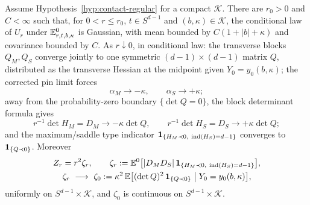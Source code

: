 \begin{proposition}\label{prop:contact-soft-limits}
Assume Hypothesis~\ref{hyp:contact-regular} for a compact $\mathcal K$. There are $r_0>0$ and $C<\infty$ such that, for $0<r\le r_0$, $t\in S^{d-1}$ and $(b,\kappa)\in\mathcal K$, the conditional law of $U_r$ under $\mathbb E^0_{r,t,b,\kappa}$ is Gaussian, with mean bounded by $C(1+|b|+\kappa)$ and covariance bounded by $C$. As $r\downarrow0$, in conditional law: the transverse blocks $Q_M,Q_S$ converge jointly to one symmetric $(d-1)\times(d-1)$ matrix $Q$, distributed as the transverse Hessian at the midpoint given $Y_0=y_0(b,\kappa)$; the corrected pin limit forces
\begin{equation}\label{eq:contact-alpha-limits}
\alpha_M\to-\kappa,\qquad\alpha_S\to+\kappa ;
\end{equation}
away from the probability-zero boundary $\{\det Q=0\}$, the block determinant formula gives
\begin{equation}\label{eq:contact-det-limits}
r^{-1}\det H_M=D_M\to-\kappa\det Q,\qquad r^{-1}\det H_S=D_S\to+\kappa\det Q ;
\end{equation}
and the maximum/saddle type indicator $\mathbf 1_{\{H_M\prec0,\ \operatorname{ind}(H_S)=d-1\}}$ converges to $\mathbf 1_{\{Q\prec0\}}$. Moreover
\begin{equation}\label{eq:contact-zeta}
\begin{gathered}
Z_r=r^2\zeta_r,\qquad\zeta_r:=\E^0\bigl[|D_MD_S|\,\ind_{\{H_M\prec0,\ \Ind(H_S)=d-1\}}\bigr],\\
\zeta_r\ \longrightarrow\ \zeta_0:=\kappa^2\,\E\bigl[(\det Q)^2\,\ind_{\{Q\prec0\}}\bigm|Y_0=y_0(b,\kappa)\bigr],
\end{gathered}
\end{equation}
uniformly on $S^{d-1}\times\mathcal K$, and $\zeta_0$ is continuous on $S^{d-1}\times\mathcal K$.
\end{proposition}

